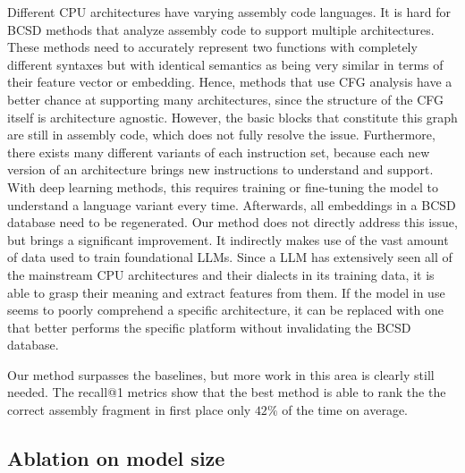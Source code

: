 \documentclass[conference,compsoc]{IEEEtran}
\begin{document}
Different CPU architectures have varying assembly code languages. It is hard for BCSD methods that analyze assembly code to support
multiple architectures. These methods need to accurately represent two functions with completely different syntaxes but with identical
semantics as being very similar in terms of their feature vector or embedding. Hence, methods that use CFG analysis have a better chance
at supporting many architectures, since the structure of the CFG itself is architecture agnostic. However, the basic blocks that constitute
this graph are still in assembly code, which does not fully resolve the issue. Furthermore, there exists many different variants of each
instruction set, because each new version of an architecture brings new instructions to understand and support. With deep learning methods,
this requires training or fine-tuning the model to understand a language variant every time. Afterwards, all embeddings in a BCSD database need to
be regenerated. Our method does not directly address this issue, but brings a significant improvement. It indirectly makes use of the vast
amount of data used to train foundational LLMs. Since a LLM has extensively seen all of the mainstream CPU architectures and their dialects
in its training data, it is able to grasp their meaning and extract features from them. If the model in use seems to poorly comprehend a
specific architecture, it can be replaced with one that better performs the specific platform without invalidating the BCSD database.

Our method surpasses the baselines, but more work in this area is clearly still needed. The recall@1 metrics show that the best method
is able to rank the the correct assembly fragment in first place only \(42\%\) of the time on average.

\subsection{Ablation on model size}
\end{document}
